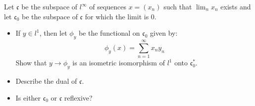 \documentclass[12pt]{article}
\begin{document}


\begin{problem}{42}
    Let $\mathfrak{c}$ be the subspace of $l^\infty$ of sequences $x = (x_n)$ such that $\lim_n x_n$ exists and let $\mathfrak{c}_0$ be the subspace of $\mathfrak{c}$ for which the limit is $0$. 
    \begin{itemize}
        \item If $y \in l^1$, then let $\phi_y$ be the functional on $\mathfrak{c}_0$ given by: 
        \[ \phi_y(x) = \sum_{n=1}^\infty x_ny_n\]
        Show that $y \to \phi_y$ is an isometric isomorphism of $l^1$ onto $\mathfrak{c}_0^*$. 
        \item Describe the dual of $\mathfrak{c}$. 
        \item Is either $\mathfrak{c}_0$ or $\mathfrak{c}$ reflexive?
    \end{itemize}
\end{problem}
\end{document}

